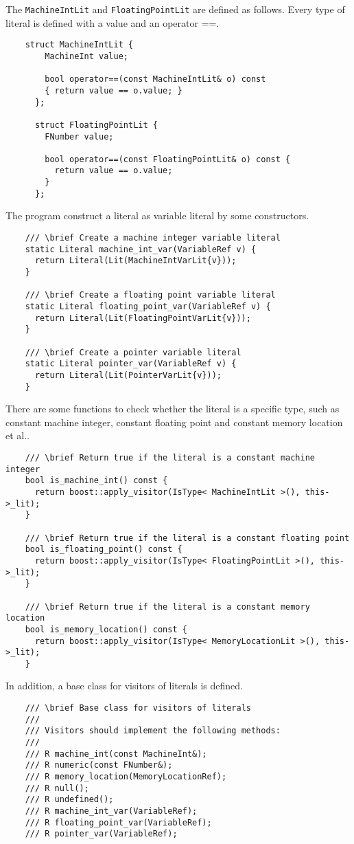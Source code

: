 \documentclass[12pt]{article}
\begin{document}
The \texttt{MachineIntLit} and \texttt{FloatingPointLit} are defined as follows. Every type of literal is defined with a value and an operator ==.
\begin{lstlisting}
    struct MachineIntLit {
        MachineInt value;
    
        bool operator==(const MachineIntLit& o) const 
        { return value == o.value; }
      };
    
      struct FloatingPointLit {
        FNumber value;
    
        bool operator==(const FloatingPointLit& o) const {
          return value == o.value;
        }
      };
\end{lstlisting}

The program construct a literal as variable literal by some constructors.

\begin{lstlisting}
    /// \brief Create a machine integer variable literal
    static Literal machine_int_var(VariableRef v) {
      return Literal(Lit(MachineIntVarLit{v}));
    }
  
    /// \brief Create a floating point variable literal
    static Literal floating_point_var(VariableRef v) {
      return Literal(Lit(FloatingPointVarLit{v}));
    }
  
    /// \brief Create a pointer variable literal
    static Literal pointer_var(VariableRef v) {
      return Literal(Lit(PointerVarLit{v}));
    }
\end{lstlisting}

There are some functions to check whether the literal is a specific type, such as constant machine integer, constant floating point and constant memory location et al..
\begin{lstlisting}
    /// \brief Return true if the literal is a constant machine integer
    bool is_machine_int() const {
      return boost::apply_visitor(IsType< MachineIntLit >(), this->_lit);
    }
  
    /// \brief Return true if the literal is a constant floating point
    bool is_floating_point() const {
      return boost::apply_visitor(IsType< FloatingPointLit >(), this->_lit);
    }
  
    /// \brief Return true if the literal is a constant memory location
    bool is_memory_location() const {
      return boost::apply_visitor(IsType< MemoryLocationLit >(), this->_lit);
    }
\end{lstlisting}

In addition, a base class for visitors of literals is defined.
\begin{lstlisting}
    /// \brief Base class for visitors of literals
    ///
    /// Visitors should implement the following methods:
    ///
    /// R machine_int(const MachineInt&);
    /// R numeric(const FNumber&);
    /// R memory_location(MemoryLocationRef);
    /// R null();
    /// R undefined();
    /// R machine_int_var(VariableRef);
    /// R floating_point_var(VariableRef);
    /// R pointer_var(VariableRef);
\end{lstlisting}
\end{document}
